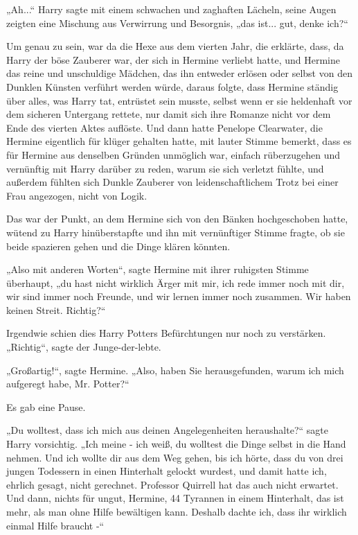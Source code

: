 {„Ah...“ Harry sagte mit einem schwachen und zaghaften Lächeln, seine Augen zeigten eine Mischung aus Verwirrung und Besorgnis, „das ist... gut, denke ich?“

Um genau zu sein, war da die Hexe aus dem vierten Jahr, die erklärte, dass, da Harry der böse Zauberer war, der sich in Hermine verliebt hatte, und Hermine das reine und unschuldige Mädchen, das ihn entweder erlösen oder selbst von den Dunklen Künsten verführt werden würde, daraus folgte, dass Hermine ständig über alles, was Harry tat, entrüstet sein musste, selbst wenn er sie heldenhaft vor dem sicheren Untergang rettete, nur damit sich ihre Romanze nicht vor dem Ende des vierten Aktes auflöste. Und dann hatte Penelope Clearwater, die Hermine eigentlich für klüger gehalten hatte, mit lauter Stimme bemerkt, dass es für Hermine aus denselben Gründen unmöglich war, einfach rüberzugehen und vernünftig mit Harry darüber zu reden, warum sie sich verletzt fühlte, und außerdem fühlten sich Dunkle Zauberer von leidenschaftlichem Trotz bei einer Frau angezogen, nicht von Logik.

Das war der Punkt, an dem Hermine sich von den Bänken hochgeschoben hatte, wütend zu Harry hinüberstapfte und ihn mit vernünftiger Stimme fragte, ob sie beide spazieren gehen und die Dinge klären könnten.

„Also mit anderen Worten“, sagte Hermine mit ihrer ruhigsten Stimme überhaupt, „du hast nicht wirklich Ärger mit mir, ich rede immer noch mit dir, wir sind immer noch Freunde, und wir lernen immer noch zusammen. Wir haben keinen Streit. Richtig?“

Irgendwie schien dies Harry Potters Befürchtungen nur noch zu verstärken.\\ „Richtig“, sagte der Junge-der-lebte.

„Großartig!“, sagte Hermine. „Also, haben Sie herausgefunden, warum ich mich aufgeregt habe, Mr. Potter?“

Es gab eine Pause.

„Du wolltest, dass ich mich aus deinen Angelegenheiten heraushalte?“ sagte Harry vorsichtig. „Ich meine - ich weiß, du wolltest die Dinge selbst in die Hand nehmen. Und ich wollte dir aus dem Weg gehen, bis ich hörte, dass du von drei jungen Todessern in einen Hinterhalt gelockt wurdest, und damit hatte ich, ehrlich gesagt, nicht gerechnet. Professor Quirrell hat das auch nicht erwartet. Und dann, nichts für ungut, Hermine, 44 Tyrannen in einem Hinterhalt, das ist mehr, als man ohne Hilfe bewältigen kann. Deshalb dachte ich, dass ihr wirklich einmal Hilfe braucht -“

}

